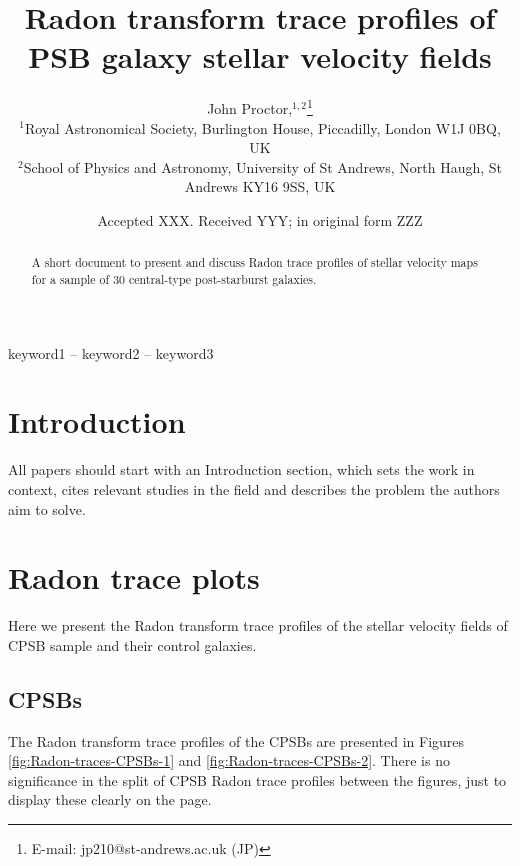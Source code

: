 \documentclass[fleqn,usenatbib]{mnras}
\title[Radon trace profiles of PSB galaxies]{Radon transform trace profiles of PSB galaxy stellar velocity fields}
\author[J. Proctor et al.]{
John Proctor,$^{1,2}$\thanks{E-mail: jp210@st-andrews.ac.uk (JP)}
\\
$^{1}$Royal Astronomical Society, Burlington House, Piccadilly, London W1J 0BQ, UK\\
$^{2}$School of Physics and Astronomy, University of St Andrews, North Haugh, St Andrews KY16 9SS, UK\\
}
\date{Accepted XXX. Received YYY; in original form ZZZ}
\begin{document}
\label{firstpage}
\pagerange{\pageref{firstpage}--\pageref{lastpage}}
\maketitle

\begin{abstract}
A short document to present and discuss Radon trace profiles of stellar velocity maps for a sample of 30 central-type post-starburst galaxies. 
\end{abstract}

\begin{keywords}
keyword1 -- keyword2 -- keyword3
\end{keywords}


\section{Introduction}

All papers should start with an Introduction section, which sets the work in context, cites relevant studies in the field and describes the problem the authors aim to solve.


\section{Radon trace plots}
\label{Radon-trace-plots}

Here we present the Radon transform trace profiles of the stellar velocity fields of CPSB sample and their control galaxies. 

\subsection{CPSBs}

The Radon transform trace profiles of the CPSBs are presented in Figures \ref{fig:Radon-traces-CPSBs-1} and \ref{fig:Radon-traces-CPSBs-2}. There is no significance in the split of CPSB Radon trace profiles between the figures, just to display these clearly on the page.
\end{document}

